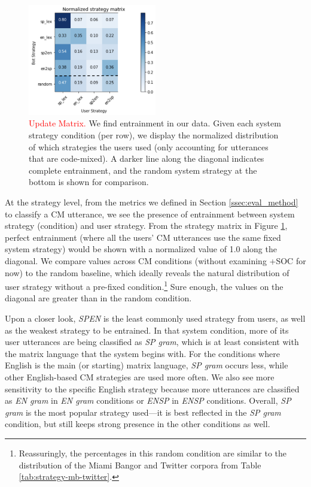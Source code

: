 \documentclass[11pt,a4paper]{article}
\newcommand{\red}[1]{\textcolor{red}{#1}}
\begin{document}
\begin{figure}
	\includegraphics[width=0.5\textwidth]{img/0924_entrain}
	\centering
  	\caption{\red{Update Matrix.} We find entrainment in our data. Given each system strategy condition (per row), we display the normalized distribution of which strategies the users used (only accounting for utterances that are code-mixed). A darker line along the diagonal indicates complete entrainment, and the random system strategy at the bottom is shown for comparison.}
    \label{fig:entrain_matrix}
\end{figure}

At the strategy level, from the metrics we defined in Section \ref{ssec:eval_method} to classify a CM utterance, we see the presence of entrainment between system strategy (condition) and user strategy. 
From the strategy matrix in Figure \ref{fig:entrain_matrix}, perfect entrainment  (where all the users' CM utterances use the same fixed system strategy) would be shown with a normalized value of 1.0 along the diagonal. 
We compare values across CM conditions (without examining +SOC for now) to the random baseline, which ideally reveals the natural distribution of user strategy without a pre-fixed condition.\footnote{Reassuringly, the percentages in this random condition are similar to the distribution of the Miami Bangor and Twitter corpora from Table \ref{tab:strategy-mb-twitter}.}
Sure enough, the values on the diagonal are greater than in the random condition.

Upon a closer look, \textit{SP\textrightarrow EN} is the least commonly used strategy from users, as well as the weakest strategy to be entrained. 
In that system condition, more of its user utterances are being classified as \textit{SP gram}, which is at least  consistent with the matrix language that the system begins with.
For the conditions where English is the main (or starting) matrix language, \textit{SP gram} occurs less, while other English-based CM strategies are used more often. 
We also see more sensitivity to the specific English strategy because more utterances are classified as \textit{EN gram} in \textit{EN gram} conditions or \textit{EN\textrightarrow SP} in \textit{EN\textrightarrow SP} conditions.
Overall, \textit{SP gram} is the most popular strategy used---it is best reflected in the \textit{SP gram} condition, but still keeps strong presence in the other conditions as well.
\end{document}
